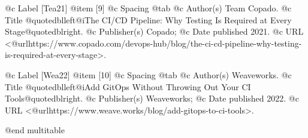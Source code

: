 @c Label [Tea21]
@item [9]
@c Spacing
@tab
@c Author(s)
Team Copado.
@c Title
@quotedblleft{}@i{The CI/CD Pipeline: Why Testing Is Required at Every Stage}@quotedblright{}.
@c Publisher(s)
Copado;
@c Date published
2021.
@c URL
<@url{https://www.copado.com/devops-hub/blog/the-ci-cd-pipeline-why-testing-is-required-at-every-stage}>.

@c Label [Wea22]
@item [10]
@c Spacing
@tab
@c Author(s)
Weaveworks.
@c Title
@quotedblleft{}@i{Add GitOps Without Throwing Out Your CI Tools}@quotedblright{}.
@c Publisher(s)
Weaveworks;
@c Date published
2022.
@c URL
<@url{https://www.weave.works/blog/add-gitops-to-ci-tools}>.


@end multitable
